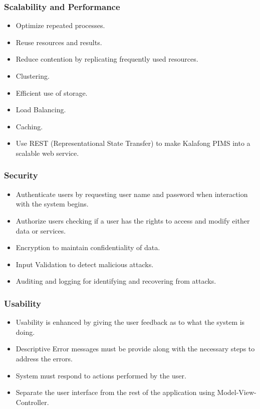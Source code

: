 	
\subsubsection{Scalability and Performance}
	\begin{itemize}
		\item Optimize repeated processes.
		\item Reuse resources and results.
		\item Reduce contention by replicating frequently used resources.
		\item Clustering.
		\item Efficient use of storage.
		\item Load Balancing.
		\item Caching.
		\item Use REST (Representational State Transfer) to make Kalafong PIMS into a scalable web service.
	\end{itemize}	
\subsubsection{Security}
	\begin{itemize}
		\item Authenticate users by requesting user name and password when interaction with the system begins.
		\item Authorize users checking if a user has the rights to access and modify either data or services.
		\item Encryption to maintain confidentiality of data.
		\item Input Validation to detect malicious attacks.
		\item Auditing and logging for identifying and recovering from attacks.
	\end{itemize}	
\subsubsection{Usability}
	\begin{itemize}
		\item Usability is enhanced by giving the user feedback as to what the system is doing.
		\item Descriptive Error messages must be provide along with the necessary steps to address the errors.
		\item System must respond to actions performed by the user.
		\item Separate the user interface from the rest of the application using Model-View-Controller.
	\end{itemize}

